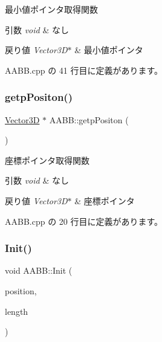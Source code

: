 最小値ポインタ取得関数 


\begin{DoxyParams}{引数}
{\em void} & なし \\
\hline
\end{DoxyParams}

\begin{DoxyRetVals}{戻り値}
{\em Vector3\+D$\ast$} & 最小値ポインタ \\
\hline
\end{DoxyRetVals}


 A\+A\+B\+B.\+cpp の 41 行目に定義があります。

\mbox{\label{class_a_a_b_b_ad89a0086c07d2bf1e0531ae6a0877664}} 
\subsubsection{\texorpdfstring{getp\+Positon()}{getpPositon()}}
{\footnotesize\ttfamily \mbox{\hyperlink{class_vector3_d}{Vector3D}} $\ast$ A\+A\+B\+B\+::getp\+Positon (\begin{DoxyParamCaption}{ }\end{DoxyParamCaption})}



座標ポインタ取得関数 


\begin{DoxyParams}{引数}
{\em void} & なし \\
\hline
\end{DoxyParams}

\begin{DoxyRetVals}{戻り値}
{\em Vector3\+D$\ast$} & 座標ポインタ \\
\hline
\end{DoxyRetVals}


 A\+A\+B\+B.\+cpp の 20 行目に定義があります。

\mbox{\label{class_a_a_b_b_a28167704c3b21de2ae9f70ac139781c4}} 
\subsubsection{\texorpdfstring{Init()}{Init()}}
{\footnotesize\ttfamily void A\+A\+B\+B\+::\+Init (\begin{DoxyParamCaption}\item[{\mbox{\hyperlink{class_vector3_d}{Vector3D}}}]{position,  }\item[{\mbox{\hyperlink{class_vector3_d}{Vector3D}}}]{length }\end{DoxyParamCaption})}



